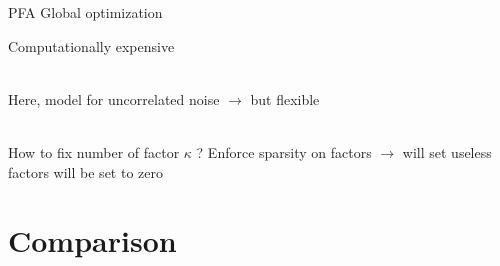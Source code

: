 \documentclass[9pt,xcolor=x11names,compress, notes=show]{beamer}%
\begin{document}
\begin{frame}{\insertsectionhead}
\begin{itemize}
	\end{itemize}
		
	\begin{block}{PFA}
		 Global optimization \hfill\parbox{0.5\linewidth}{ Computationally expensive}\\
		 Here, model for uncorrelated noise $\bm{\rightarrow}$  but flexible
	\end{block}~\\
	
	
	How to fix number of factor $\kappa$ ?
	Enforce sparsity on factors $\rightarrow$ will set useless factors will be set to zero
\end{frame}

\section{Comparison}
\end{document}

